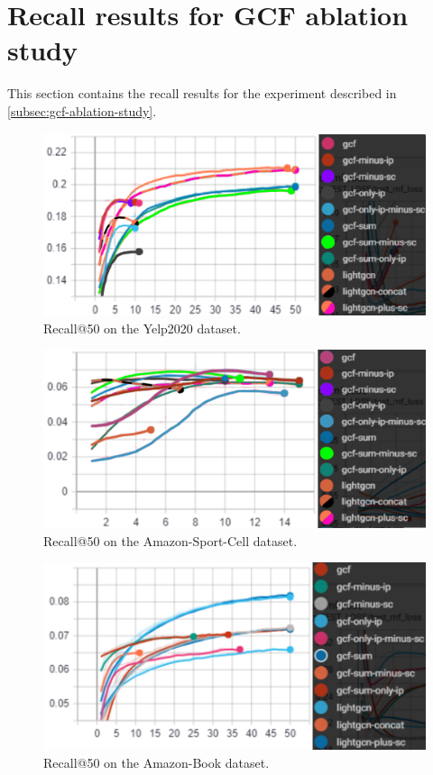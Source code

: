\section{Recall results for GCF ablation study}\label{app:recall-results-gcf-ablation}
This section contains the recall results for the experiment described in \autoref{subsec:gcf-ablation-study}.
\begin{figure}[h!]
    \includegraphics[width=\linewidth]{figures/gcf-all-recall.png}
    \caption{Recall@50 on the Yelp2020 dataset.}
    \label{fig:GCF-recall-ablation-study}
\end{figure}
\begin{figure}[h!]
    \includegraphics[width=\linewidth]{figures/amazon-cell-sport-gcf-all-recall.png}
    \caption{Recall@50 on the Amazon-Sport-Cell dataset.}
    \label{fig:GCF-recall-ablation-study-amazon-cell-sport}
\end{figure}
\begin{figure}[h!]
    \includegraphics[width=\linewidth]{figures/amazon-book-gcf-all-recall.png}
    \caption{Recall@50 on the Amazon-Book dataset.}
    \label{fig:GCF-recall-ablation-study-amazon-book}
\end{figure}
